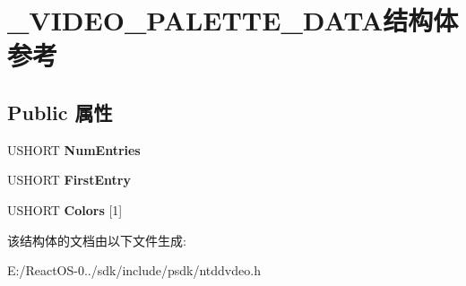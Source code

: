 \hypertarget{struct___v_i_d_e_o___p_a_l_e_t_t_e___d_a_t_a}{}\section{\+\_\+\+V\+I\+D\+E\+O\+\_\+\+P\+A\+L\+E\+T\+T\+E\+\_\+\+D\+A\+T\+A结构体 参考}
\label{struct___v_i_d_e_o___p_a_l_e_t_t_e___d_a_t_a}
\subsection*{Public 属性}
\begin{DoxyCompactItemize}
\item 
\mbox{\label{struct___v_i_d_e_o___p_a_l_e_t_t_e___d_a_t_a_a529db1ef5ae8cd69f5f6905edd83be35}} 
U\+S\+H\+O\+RT {\bfseries Num\+Entries}
\item 
\mbox{\label{struct___v_i_d_e_o___p_a_l_e_t_t_e___d_a_t_a_a43c34c9c27aa92f232c9d3f3fa369f7e}} 
U\+S\+H\+O\+RT {\bfseries First\+Entry}
\item 
\mbox{\label{struct___v_i_d_e_o___p_a_l_e_t_t_e___d_a_t_a_aca278ef4945dda8b205fe7def54e3029}} 
U\+S\+H\+O\+RT {\bfseries Colors} \mbox{[}1\mbox{]}
\end{DoxyCompactItemize}


该结构体的文档由以下文件生成\+:\begin{DoxyCompactItemize}
\item 
E\+:/\+React\+O\+S-\/0../sdk/include/psdk/ntddvdeo.\+h\end{DoxyCompactItemize}
